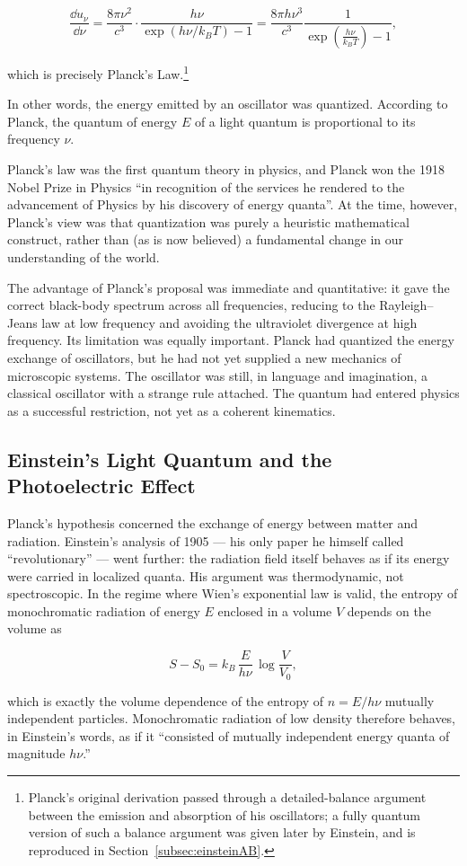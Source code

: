 \begin{linenomath}\begin{equation}
    \frac{\dd u_\nu}{\dd \nu}
    = \frac{8\pi\nu^2}{c^3}\cdot\frac{h\nu}{\exp(h\nu/k_BT)-1}
    = \frac{8\pi h \nu^3}{c^3}\frac{1}{\exp(\frac{h\nu}{k_BT})-1},
\end{equation}\end{linenomath}
which is precisely Planck's Law.\footnote{Planck's original derivation passed through a detailed-balance argument between the emission and absorption of his oscillators; a fully quantum version of such a balance argument was given later by Einstein, and is reproduced in Section~\ref{subsec:einsteinAB}.}

In other words, the energy emitted by an oscillator was quantized. According to Planck, the quantum of energy $E$ of a light quantum is proportional to its frequency $\nu$.

Planck's law was the first quantum theory in physics, and Planck won the 1918 Nobel Prize in Physics ``in recognition of the services he rendered to the advancement of Physics by his discovery of energy quanta''. At the time, however, Planck's view was that quantization was purely a heuristic mathematical construct, rather than (as is now believed) a fundamental change in our understanding of the world.

The advantage of Planck's proposal was immediate and quantitative: it gave the correct black-body spectrum across all frequencies, reducing to the Rayleigh--Jeans law at low frequency and avoiding the ultraviolet divergence at high frequency. Its limitation was equally important. Planck had quantized the energy exchange of oscillators, but he had not yet supplied a new mechanics of microscopic systems. The oscillator was still, in language and imagination, a classical oscillator with a strange rule attached. The quantum had entered physics as a successful restriction, not yet as a coherent kinematics.

\subsection{Einstein's Light Quantum and the Photoelectric Effect}
Planck's hypothesis concerned the exchange of energy between matter and radiation. Einstein's analysis of 1905 --- his only paper he himself called ``revolutionary'' --- went further: the radiation field itself behaves as if its energy were carried in localized quanta. His argument was thermodynamic, not spectroscopic. In the regime where Wien's exponential law is valid, the entropy of monochromatic radiation of energy $E$ enclosed in a volume $V$ depends on the volume as
\begin{linenomath}
    \begin{equation}
        S-S_0=k_B\,\frac{E}{h\nu}\,\log\frac{V}{V_0},
    \end{equation}
\end{linenomath}
which is exactly the volume dependence of the entropy of $n=E/h\nu$ mutually independent particles. Monochromatic radiation of low density therefore behaves, in Einstein's words, as if it ``consisted of mutually independent energy quanta of magnitude $h\nu$.''

